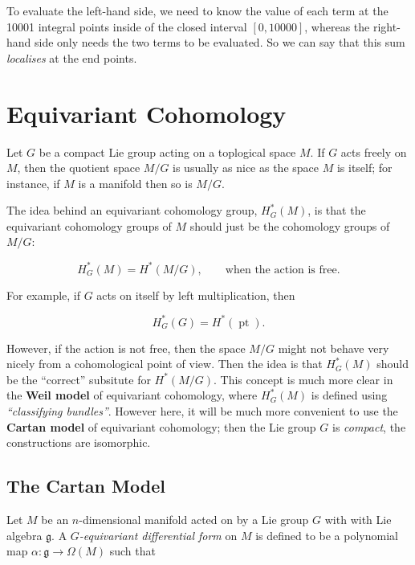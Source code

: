 \documentclass{article}
\newcommand{\ra}{\rightarrow}
\newcommand{\W}{\Omega}
\newcommand{\mfg}{\mathfrak{g}}
\DeclareMathOperator{\pt}{pt}
\begin{document}
To evaluate the left-hand side, we need to know the value of each term at the 10001 integral points inside of the closed interval $[0, 10000]$, whereas the right-hand side only needs the two terms to be evaluated. So we can say that this sum \emph{localises} at the end points.

\section{Equivariant Cohomology}

Let $G$ be a compact Lie group acting on a toplogical space $M$. If $G$ acts freely on $M$, then the quotient space $M/G$ is usually as nice as the space $M$ is itself; for instance, if $M$ is a manifold then so is $M/G$.

The idea behind an equivariant cohomology group, $H_{G}^{\ast}(M)$, is that the equivariant cohomology groups of $M$ should just be the cohomology groups of $M/G$:

\begin{equation*}
	H_{G}^{\ast}(M) = H^{\ast}(M/G), \qquad \text{when the action is free.}
\end{equation*}

For example, if $G$ acts on itself by left multiplication, then

\begin{equation*}
	H_{G}^{\ast}(G) = H^{\ast}(\pt).
\end{equation*}

However, if the action is not free, then the space $M/G$ might not behave very nicely from a cohomological point of view. Then the idea is that $H_{G}^{\ast}(M)$ should be the ``correct'' subsitute for $H^{\ast}(M/G)$. This concept is much more clear in the \textbf{Weil model} of equivariant cohomology, where $H_{G}^{\ast}(M)$ is defined using \emph{``classifying bundles''}. However here, it will be much more convenient to use the \textbf{Cartan model} of equivariant cohomology; then the Lie group $G$ is \emph{compact}, the constructions are isomorphic.

\subsection{The Cartan Model}

Let $M$ be an $n$-dimensional manifold acted on by a Lie group $G$ with with Lie algebra $\mfg$. A \emph{$G$-equivariant differential form} on $M$ is defined to be a polynomial map $\alpha : \mfg \ra \W(M)$ such that
\end{document}
